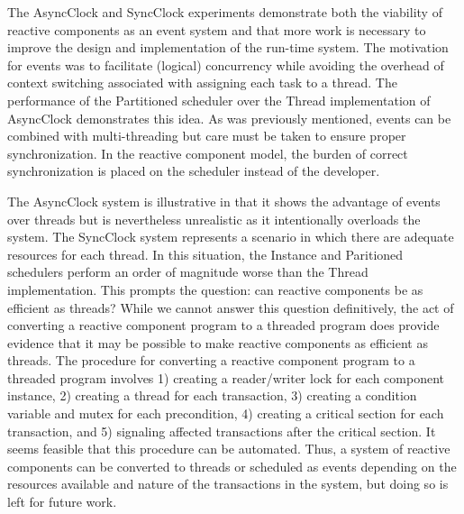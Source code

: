 The AsyncClock and SyncClock experiments demonstrate both the viability of reactive components as an event system and that more work is necessary to improve the design and implementation of the run-time system.
The motivation for events was to facilitate (logical) concurrency while avoiding the overhead of context switching associated with assigning each task to a thread.
The performance of the Partitioned scheduler over the Thread implementation of AsyncClock demonstrates this idea.
As was previously mentioned, events can be combined with multi-threading but care must be taken to ensure proper synchronization.
In the reactive component model, the burden of correct synchronization is placed on the scheduler instead of the developer.

The AsyncClock system is illustrative in that it shows the advantage of events over threads but is nevertheless unrealistic as it intentionally overloads the system.
The SyncClock system represents a scenario in which there are adequate resources for each thread.
In this situation, the Instance and Paritioned schedulers perform an order of magnitude worse than the Thread implementation.
This prompts the question:  can reactive components be as efficient as threads?
While we cannot answer this question definitively, the act of converting a reactive component program to a threaded program does provide evidence that it may be possible to make reactive components as efficient as threads.
The procedure for converting a reactive component program to a threaded program involves 1) creating a reader/writer lock for each component instance, 2) creating a thread for each transaction, 3) creating a condition variable and mutex for each precondition, 4) creating a critical section for each transaction, and 5) signaling affected transactions after the critical section.
It seems feasible that this procedure can be automated.
Thus, a system of reactive components can be converted to threads or scheduled as events depending on the resources available and nature of the transactions in the system, but doing so is left for future work.
